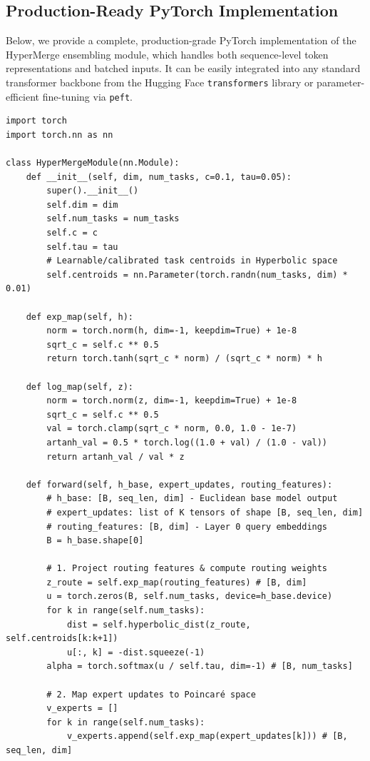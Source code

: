 \documentclass{article}
\theoremstyle{plain}
\theoremstyle{definition}
\theoremstyle{remark}
\begin{document}
\subsection{Production-Ready PyTorch Implementation}
Below, we provide a complete, production-grade PyTorch implementation of the HyperMerge ensembling module, which handles both sequence-level token representations and batched inputs. It can be easily integrated into any standard transformer backbone from the Hugging Face \texttt{transformers} library or parameter-efficient fine-tuning via \texttt{peft}.

\begin{verbatim}
import torch
import torch.nn as nn

class HyperMergeModule(nn.Module):
    def __init__(self, dim, num_tasks, c=0.1, tau=0.05):
        super().__init__()
        self.dim = dim
        self.num_tasks = num_tasks
        self.c = c
        self.tau = tau
        # Learnable/calibrated task centroids in Hyperbolic space
        self.centroids = nn.Parameter(torch.randn(num_tasks, dim) * 0.01)
        
    def exp_map(self, h):
        norm = torch.norm(h, dim=-1, keepdim=True) + 1e-8
        sqrt_c = self.c ** 0.5
        return torch.tanh(sqrt_c * norm) / (sqrt_c * norm) * h

    def log_map(self, z):
        norm = torch.norm(z, dim=-1, keepdim=True) + 1e-8
        sqrt_c = self.c ** 0.5
        val = torch.clamp(sqrt_c * norm, 0.0, 1.0 - 1e-7)
        artanh_val = 0.5 * torch.log((1.0 + val) / (1.0 - val))
        return artanh_val / val * z
        
    def forward(self, h_base, expert_updates, routing_features):
        # h_base: [B, seq_len, dim] - Euclidean base model output
        # expert_updates: list of K tensors of shape [B, seq_len, dim]
        # routing_features: [B, dim] - Layer 0 query embeddings
        B = h_base.shape[0]
        
        # 1. Project routing features & compute routing weights
        z_route = self.exp_map(routing_features) # [B, dim]
        u = torch.zeros(B, self.num_tasks, device=h_base.device)
        for k in range(self.num_tasks):
            dist = self.hyperbolic_dist(z_route, self.centroids[k:k+1])
            u[:, k] = -dist.squeeze(-1)
        alpha = torch.softmax(u / self.tau, dim=-1) # [B, num_tasks]
        
        # 2. Map expert updates to Poincaré space
        v_experts = []
        for k in range(self.num_tasks):
            v_experts.append(self.exp_map(expert_updates[k])) # [B, seq_len, dim]
            

\end{verbatim}
\end{document}
